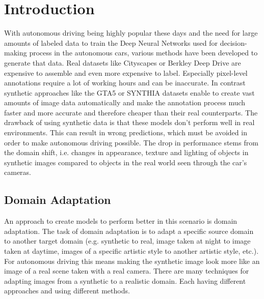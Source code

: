 \chapter{Introduction}
\label{sec:introduction}
With autonomous driving being highly popular these days and the need for large amounts of labeled data to train the Deep Neural Networks used for decision-making process in the autonomous cars, various methods have been developed to generate that data. Real datasets like Cityscapes \cite{Cordts_2016_CVPR} or Berkley Deep Drive \cite{DBLP:journals/corr/abs-1805-04687} are expensive to assemble and even more expensive to label. Especially pixel-level annotations require a lot of working hours and can be inaccurate. In contrast synthetic approaches like the GTA5 \cite{Richter_2016_ECCV} or SYNTHIA \cite{RosCVPR16} datasets enable to create vast amounts of image data automatically and make the annotation process much faster and more accurate and therefore cheaper than their real counterparts. The drawback of using synthetic data is that these models don't perform well in real environments. This can result in wrong predictions, which must be avoided in order to make autonomous driving possible. The drop in performance stems from the domain shift, i.e. changes in appearance, texture and lighting of objects in synthetic images compared to objects in the real world seen through the car's cameras.

\section{Domain Adaptation}
An approach to create models to perform better in this scenario is domain adaptation. The task of domain adaptation is to adapt a specific source domain to another target domain (e.g. synthetic to real, image taken at night to image taken at daytime, images of a specific artistic style to another artistic style, etc.). For autonomous driving this means making the synthetic image look more like an image of a real scene taken with a real camera. There are many techniques for adapting images from a synthetic to a realistic domain. Each having different approaches and using different methods. 


